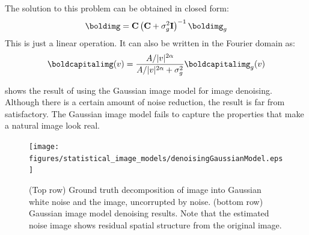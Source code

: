 The solution to this problem can be obtained in closed form:
\begin{equation}
{\boldimg} = {\bf C} \left( {\bf C} + \sigma_g^2   \mathbf{I} \right)^{-1} {\boldimg}_g
\end{equation}
This is just a linear operation. It can also be written in the Fourier domain as:
\begin{equation}
\boldcapitalimg(v) = \frac{A/|v|^{2\alpha}}{A/|v|^{2\alpha} + \sigma_g^2} \boldcapitalimg_g(v) 
\end{equation}

\Fig{\ref{fig:denoisingGaussianModel}} shows the result of using the Gaussian image model for image denoising. Although there is a certain amount of noise reduction, the result is far from satisfactory. The Gaussian image model fails to capture the properties that make a natural image look real. 

\begin{figure}[t]
\centerline{
\texttt{[image: figures/statistical\_image\_models/denoisingGaussianModel.eps]}
} 
\caption{(Top row) Ground truth decomposition of image into Gaussian white noise and the image, uncorrupted by noise.  (bottom row) Gaussian image model denoising results.  Note that the estimated noise image shows residual spatial structure from the original image.} 
\label{fig:denoisingGaussianModel}
\end{figure}











